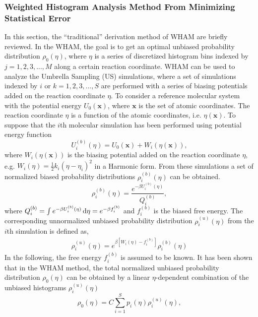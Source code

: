 \subsubsection{Weighted Histogram Analysis Method From Minimizing Statistical Error}
In this section, the ``traditional'' derivation method of WHAM are briefly reviewed.\cite{SouailleCPC2001} In the WHAM, the goal is to get an optimal unbiased probability distribution $\rho_{0}(\eta)$, where $\eta$ is a series of discretized histogram bins indexed by $j=1,2,3,...,M$ along a certain reaction coordinate. WHAM can be used to analyze the Umbrella Sampling (US) simulations, where a set of simulations indexed by $i$ or $k=1,2,3,...,S$ are performed with a series of biasing potentials added on the reaction coordinate $\eta$. To consider a reference molecular system with the potential energy $U_{0}(\textbf{x})$, where $\textbf{x}$ is the set of atomic coordinates. The reaction coordinate $\eta$ is a function of the atomic coordinates, i.e. $\eta(\textbf{x})$. To suppose that the $i$th molecular simulation has been performed using potential energy function
\begin{equation}
U_{i}^{(b)}(\eta) = U_{0}(\textbf{x}) + W_{i}(\eta(\textbf{x})),
\label{Eq:biasmd}
\end{equation}
where $W_{i}(\eta(\textbf{x}))$ is the biasing potential added on the reaction coordinate $\eta$, e.g. $W_{i}(\eta)=\frac{1}{2}k_{i}(\eta-\eta_{i})^2$ in a Harmonic form. From these simulations a set of normalized biased probability distributions ${\rho_{i}^{(b)}(\eta)}$ can be obtained.
\begin{equation}
\rho_{i}^{(b)}(\eta) = \frac{e^{-\beta U_{i}^{(b)}(\eta)}}{Q_{i}^{(b)}},
\label{Eq:bias}
\end{equation}
where $Q_{i}^{(b)}=\int e^{-\beta U_{i}^{(b)}(\eta)} \mathop{}\!\mathrm{d}\eta = e^{-\beta f_{i}^{(b)}}$ and $f_{i}^{(b)}$ is the biased free energy.
The corresponding unnormalized unbiased probability distribution $\rho_{i}^{(u)}(\eta)$ from the $i$th simulation is defined as, 
\begin{align}
\rho_{i}^{(u)}(\eta) = e^{\beta[W_{i}(\eta)-f_{i}^{(b)}]}\rho_{i}^{(b)}(\eta)
\label{Eq:unbias}
\end{align}
In the following, the free energy $f_{i}^{(b)}$ is assumed to be known. 
It has been shown that in the WHAM method, the total normalized unbiased probability distribution $\rho_{0}(\eta)$ can be obtained by a linear $\eta$-dependent combination of the unbiased histograms $\rho_{i}^{(u)}(\eta)$ 
\begin{equation}
\rho_{0}(\eta)=C\sum_{i=1}^{S}p_{i}(\eta)\rho_{i}^{(u)}(\eta),
\label{Eq:unbias0}
\end{equation}  
